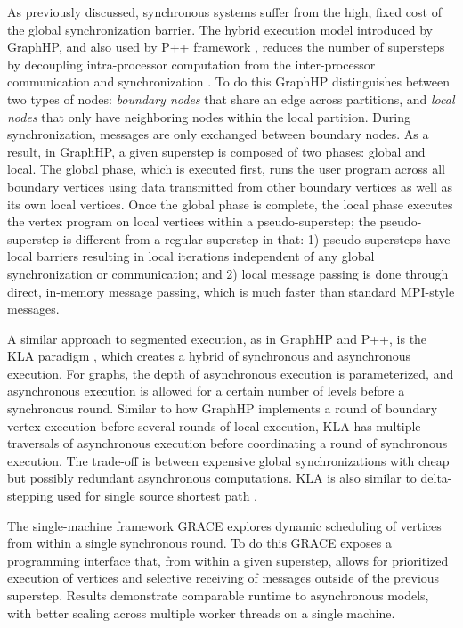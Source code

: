 \documentclass[reprint,twocolumn,showpacs,preprintnumbers,amsmath, aps,pre,amssymb]{revtex4-1}
\begin{document}
As previously discussed, synchronous systems suffer from the high, fixed cost of the global synchronization barrier.  The hybrid execution model introduced by GraphHP, and also used by P++ framework \cite{Zhou2014}, reduces the number of supersteps by decoupling intra-processor computation from the inter-processor communication and synchronization \cite{Chen}.  To do this GraphHP distinguishes between two types of nodes: \textit{boundary nodes} that share an edge across partitions, and \textit{local nodes} that only have neighboring nodes within the local partition.  During synchronization, messages are only exchanged between boundary nodes. As a result, in GraphHP, a given superstep is composed of two phases: global and local. The global phase, which is executed first, runs the user program across all boundary vertices using data transmitted from other boundary vertices as well as its own local vertices. Once the global phase is complete, the local phase executes the vertex program on local vertices within a pseudo-superstep; the pseudo-superstep is different from a regular superstep in that: 1) pseudo-supersteps have local barriers resulting in local iterations independent of any global synchronization or communication; and 2) local message passing is done through direct, in-memory message passing, which is much faster than standard MPI-style messages.

A similar approach to segmented execution, as in GraphHP and P++, is the KLA paradigm \cite{Harshvardhan2014}, which creates a hybrid of synchronous and asynchronous execution.  For graphs, the depth of asynchronous execution is parameterized, and asynchronous execution is allowed for a certain number of levels before a synchronous round.  Similar to how GraphHP implements a round of boundary vertex execution before several rounds of local execution, KLA has multiple traversals of asynchronous execution before coordinating a round of synchronous execution.  The trade-off is between expensive global synchronizations with cheap but possibly redundant asynchronous computations.  KLA is also similar to delta-stepping used for single source shortest path \cite{Meyer2003}.

The single-machine framework GRACE explores dynamic scheduling of vertices from within a single synchronous round\cite{Wang2013}. To do this GRACE exposes a programming interface that, from within a given superstep, allows for prioritized execution of vertices and selective receiving of messages outside of the previous superstep.  Results demonstrate comparable runtime to asynchronous models, with better scaling across multiple worker threads on a single machine.
\end{document}
